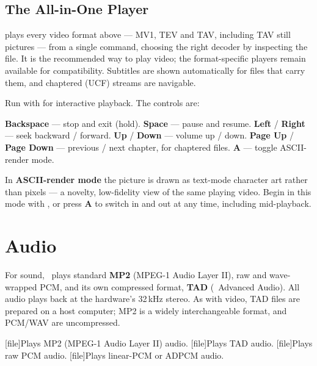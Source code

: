 \subsection{The All-in-One Player}

 plays every video format above --- MV1, TEV and TAV, including TAV still pictures --- from a single command, choosing the right decoder by inspecting the file. It is the recommended way to play video; the format-specific players remain available for compatibility. Subtitles are shown automatically for files that carry them, and chaptered (UCF) streams are navigable.

Run with  for interactive playback. The controls are:

\begin{outline}
\1\textbf{Backspace} --- stop and exit (hold).
\1\textbf{Space} --- pause and resume.
\1\textbf{Left} / \textbf{Right} --- seek backward / forward.
\1\textbf{Up} / \textbf{Down} --- volume up / down.
\1\textbf{Page Up} / \textbf{Page Down} --- previous / next chapter, for chaptered files.
\1\textbf{A} --- toggle ASCII-render mode.
\end{outline}

In \textbf{ASCII-render mode} the picture is drawn as text-mode character art rather than pixels --- a novelty, low-fidelity view of the same playing video. Begin in this mode with , or press \textbf{A} to switch in and out at any time, including mid-playback.

\section{Audio}

For sound, \thedos\ plays standard \textbf{MP2} (MPEG-1 Audio Layer II), raw and wave-wrapped PCM, and its own compressed format, \textbf{TAD} (\thismachine\ Advanced Audio). All audio plays back at the hardware's 32\,kHz stereo. As with video, TAD files are prepared on a host computer; MP2 is a widely interchangeable format, and PCM/WAV are uncompressed.

\begin{outline}
\1[file]{Plays MP2 (MPEG-1 Audio Layer II) audio.}
\1[file]{Plays TAD audio.}
\1[file]{Plays raw PCM audio.}
\1[file]{Plays linear-PCM or ADPCM  audio.}
\end{outline}

